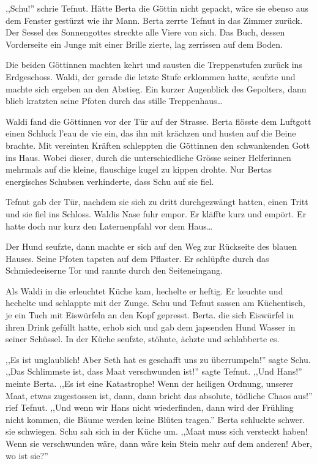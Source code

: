 ,,Schu!'' schrie Tefnut. Hätte Berta die Göttin nicht gepackt, wäre sie ebenso aus dem Fenster gestürzt wie ihr Mann. Berta zerrte Tefnut in das Zimmer zurück. Der Sessel des Sonnengottes streckte alle Viere von sich. Das Buch, dessen Vorderseite ein Junge mit einer Brille zierte, lag zerrissen auf dem Boden. 

Die beiden Göttinnen machten kehrt und sausten die Treppenstufen zurück ins Erdgeschoss. Waldi, der gerade die letzte Stufe erklommen hatte, seufzte und machte sich ergeben an den Abstieg. Ein kurzer Augenblick des Gepolters, dann blieb kratzten seine Pfoten durch das stille Treppenhaus\dots

Waldi fand die Göttinnen vor der Tür auf der Strasse. Berta flösste dem Luftgott einen Schluck l'eau de vie ein, das ihn mit krächzen und husten auf die Beine brachte. Mit vereinten Kräften schleppten die Göttinnen den schwankenden Gott ins Haus. Wobei dieser, durch die unterschiedliche Grösse seiner Helferinnen mehrmals auf die kleine, flauschige kugel zu kippen drohte. Nur Bertas energisches Schubsen verhinderte, dass Schu auf sie fiel.

Tefnut gab der Tür, nachdem sie sich zu dritt durchgezwängt hatten, einen Tritt und sie fiel ins Schloss. Waldis Nase fuhr empor. Er kläffte kurz und empört. Er hatte doch nur kurz den Laternenpfahl vor dem Haus\dots

Der Hund seufzte, dann machte er sich auf den Weg zur Rückseite des blauen Hauses. Seine Pfoten tapsten auf dem Pflaster. Er schlüpfte durch das Schmiedeeiserne Tor und rannte durch den Seiteneingang.

Als Waldi in die erleuchtet Küche kam, hechelte er heftig. Er keuchte und hechelte und schlappte mit der Zunge. Schu und Tefnut sassen am Küchentisch, je ein Tuch mit Eiswürfeln an den Kopf gepresst. Berta. die sich Eiswürfel in ihren Drink gefüllt hatte, erhob sich und gab dem japsenden Hund Wasser in seiner Schüssel. In der Küche seufzte, stöhnte, ächzte und schlabberte es.

,,Es ist unglaublich! Aber Seth hat es geschafft uns zu überrumpeln!'' sagte Schu. ,,Das Schlimmste ist, dass Maat verschwunden ist!'' sagte Tefnut. ,,Und Hans!'' meinte Berta. ,,Es ist eine Katastrophe! Wenn der heiligen Ordnung, unserer Maat, etwas zugestossen ist, dann, dann bricht das absolute, tödliche Chaos aus!'' rief Tefnut. ,,Und wenn wir Hans nicht wiederfinden, dann wird der Frühling nicht kommen, die Bäume werden keine Blüten tragen.'' Berta schluckte schwer. sie schwiegen. Schu sah sich in der Küche um. ,,Maat muss sich versteckt haben! Wenn sie verschwunden wäre, dann wäre kein Stein mehr auf dem anderen! Aber, wo ist sie?''

